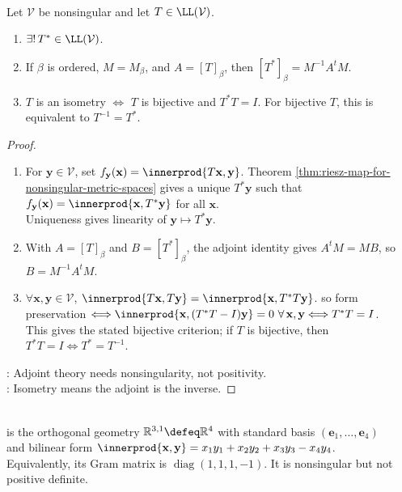 \begin{proposition} \label{prop:metric-adjoints-and-isometries} \\
Let $\mathcal{V}$ be nonsingular and let $T\in\LL(\mathcal{V})$.
\begin{enumerate}[label=(\roman*)]
\setlength{\itemsep}{0pt}
\item $\exists!\,T^*\in\LL(\mathcal{V})$.
\item If $\beta$ is ordered, $M=M_{\beta}$, and $A=[T]_{\beta}$, then $[T^*]_{\beta}=M^{-1}A^{t}M$.
\item $T$ is an isometry $\Longleftrightarrow$ $T$ is bijective and $T^*T=I$. For bijective $T$, this is equivalent to $T^{-1}=T^*$.
\end{enumerate}
\begin{proof}
\begin{enumerate}[label=(\roman*)]
\setlength{\itemsep}{0pt}
\item For $\mathbf{y}\in\mathcal{V}$, set $f_{\mathbf{y}}(\mathbf{x})=\innerprod{T\mathbf{x},\mathbf{y}}$. Theorem \ref{thm:riesz-map-for-nonsingular-metric-spaces} gives a unique $T^*\mathbf{y}$ such that $f_{\mathbf{y}}(\mathbf{x})=\innerprod{\mathbf{x},T^*\mathbf{y}}$ for all $\mathbf{x}$.\\
Uniqueness gives linearity of $\mathbf{y}\mapsto T^*\mathbf{y}$.
\item With $A=[T]_{\beta}$ and $B=[T^*]_{\beta}$, the adjoint identity gives $A^{t}M=MB$, so $B=M^{-1}A^{t}M$.
\item $\forall \mathbf{x},\mathbf{y}\in\mathcal{V}$, $\innerprod{T\mathbf{x},T\mathbf{y}} =\innerprod{\mathbf{x},T^*T\mathbf{y}}$. so form preservation $\Longleftrightarrow \innerprod{\mathbf{x},(T^*T-I)\mathbf{y}}=0\ \forall\,\mathbf{x},\mathbf{y}\Longleftrightarrow T^*T=I$.\\
This gives the stated bijective criterion; if $T$ is bijective, then $T^*T=I\Longleftrightarrow T^*=T^{-1}$.
\end{enumerate}
: Adjoint theory needs nonsingularity, not positivity.\\
: Isometry means the adjoint is the inverse.
\end{proof}
\end{proposition}

\begin{definition} \label{def:minkowski-metric-vector-space} \\
 is the orthogonal geometry $\mathbb{R}^{3,1}\defeq\mathbb{R}^4$ with standard basis $(\mathbf{e}_1,\ldots,\mathbf{e}_4)$\\
and bilinear form $\innerprod{\mathbf{x},\mathbf{y}} =x_1y_1+x_2y_2+x_3y_3-x_4y_4$.\\
Equivalently, its Gram matrix is $\operatorname{diag}(1,1,1,-1)$. It is nonsingular but not positive definite.
\end{definition}

